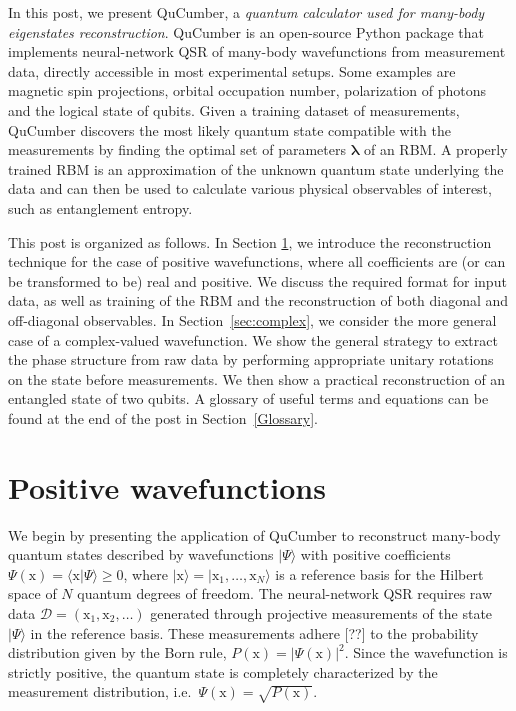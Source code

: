 \documentclass[submission, Phys, hidelnks]{SciPost}
\newcommand{\red}[1]{{\color{red} #1}}
\begin{document}
In this post, we present QuCumber, a {\it quantum calculator used for many-body eigenstates reconstruction}. QuCumber is an open-source Python package that implements neural-network QSR of many-body wavefunctions from measurement data, directly accessible in most experimental setups. Some examples are magnetic spin projections, orbital occupation number, polarization of photons and the logical state of qubits. Given a training dataset of measurements, QuCumber discovers the most likely quantum state compatible with the measurements by finding the optimal set of parameters $\bm{\lambda}$ of an RBM. A properly trained RBM is an approximation of the unknown quantum state underlying the data and can then be used to calculate various physical observables of interest, such as entanglement entropy.%

This post is organized as follows. In Section \ref{sec:positive}, we introduce the reconstruction technique for the case of positive wavefunctions, where all coefficients are (or can be transformed to be) real and positive. We discuss the required format for input data, as well as training of the RBM and the reconstruction of both diagonal and off-diagonal observables. In Section~\ref{sec:complex}, we consider the more general case of a complex-valued wavefunction. We show the general strategy to extract the phase structure from raw data by performing appropriate unitary rotations on the state before measurements. We then show a practical reconstruction of an entangled state of two qubits. A glossary of useful terms and equations can be found at the end of the post in Section~\ref{Glossary}.

\section{Positive wavefunctions}\label{sec:positive}
We begin by presenting the application of QuCumber to reconstruct many-body quantum states described by wavefunctions $|\Psi\rangle$ with positive coefficients $\Psi(\bm{\mathrm{x}})=\langle\bm{\mathrm{x}}|\Psi\rangle \ge0$, where $|\bm{\mathrm{x}}\rangle=|\mathrm{x}_1,\dots,\mathrm{x}_N\rangle$ is a reference basis for the Hilbert space of $N$ quantum degrees of freedom. The neural-network QSR requires raw data $\mathcal{D}=(\bm{\mathrm{x}}_1,\bm{\mathrm{x}}_2,\dots)$ generated through projective measurements of the state $|\Psi\rangle$ in the reference basis. These measurements adhere \red{[??]} to the probability distribution given by the Born rule, $P(\bm{\mathrm{x}})=|\Psi(\bm{\mathrm{x}})|^2$. Since the wavefunction is strictly positive, the quantum state is completely characterized by the measurement distribution, i.e.~$\Psi(\bm{\mathrm{x}})=\sqrt{P(\bm{\mathrm{x}})}$. 
\end{document}
